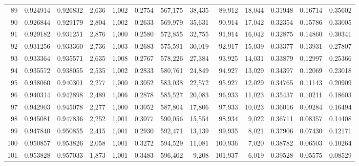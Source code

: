 \begin{tabular}{rrrrrrrrrrrrr}
89  &  0.924914 &  0.926832 &   2,636 &  1,002 &                                     0.2754 &  567,175 &   38,435 &   89,912 &   18,044 &  0.31948 &  0.16714 &  0.35602 \\
90  &  0.926844 &  0.929179 &   2,804 &  1,002 &                                     0.2633 &  569,979 &   35,631 &   90,914 &   17,042 &  0.32354 &  0.15786 &  0.33005 \\
91  &  0.929182 &  0.931251 &   2,876 &  1,000 &                                     0.2580 &  572,855 &   32,755 &   91,914 &   16,042 &  0.32875 &  0.14860 &  0.30341 \\
92  &  0.931256 &  0.933360 &   2,736 &  1,003 &                                     0.2683 &  575,591 &   30,019 &   92,917 &   15,039 &  0.33377 &  0.13931 &  0.27807 \\
93  &  0.933364 &  0.935571 &   2,635 &  1,008 &                                     0.2767 &  578,226 &   27,384 &   93,925 &   14,031 &  0.33879 &  0.12997 &  0.25366 \\
94  &  0.935572 &  0.938055 &   2,535 &  1,002 &                                     0.2833 &  580,761 &   24,849 &   94,927 &   13,029 &  0.34397 &  0.12069 &  0.23018 \\
95  &  0.938060 &  0.940301 &   2,277 &  1,000 &                                     0.3052 &  583,038 &   22,572 &   95,927 &   12,029 &  0.34765 &  0.11143 &  0.20909 \\
96  &  0.940314 &  0.942898 &   2,489 &  1,006 &                                     0.2878 &  585,527 &   20,083 &   96,933 &   11,023 &  0.35437 &  0.10211 &  0.18603 \\
97  &  0.942903 &  0.945078 &   2,277 &  1,000 &                                     0.3052 &  587,804 &   17,806 &   97,933 &   10,023 &  0.36016 &  0.09284 &  0.16494 \\
98  &  0.945081 &  0.947836 &   2,252 &  1,001 &                                     0.3077 &  590,056 &   15,554 &   98,934 &    9,022 &  0.36711 &  0.08357 &  0.14408 \\
99  &  0.947840 &  0.950855 &   2,415 &  1,001 &                                     0.2930 &  592,471 &   13,139 &   99,935 &    8,021 &  0.37906 &  0.07430 &  0.12171 \\
100 &  0.950857 &  0.953826 &   2,058 &  1,001 &                                     0.3272 &  594,529 &   11,081 &  100,936 &    7,020 &  0.38782 &  0.06503 &  0.10264 \\
101 &  0.953828 &  0.957033 &   1,873 &  1,001 &                                     0.3483 &  596,402 &    9,208 &  101,937 &    6,019 &  0.39528 &  0.05575 &  0.08529 \\

\end{tabular}
